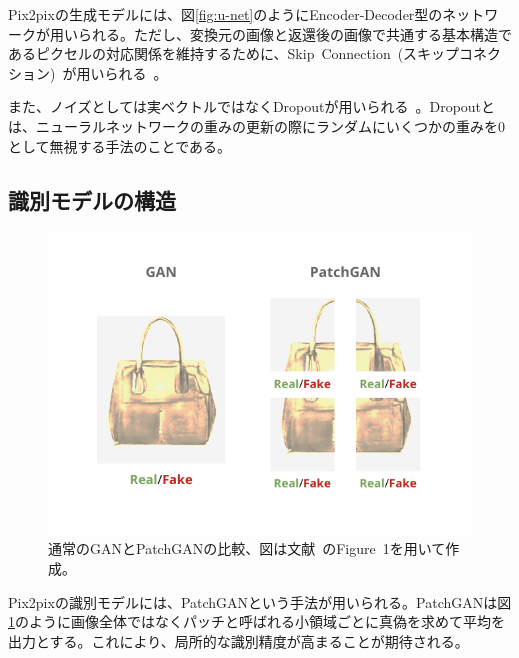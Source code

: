 Pix2pixの生成モデルには、図\ref{fig:u-net}のようにEncoder-Decoder型のネットワークが用いられる。ただし、変換元の画像と返還後の画像で共通する基本構造であるピクセルの対応関係を維持するために、Skip~Connection~(スキップコネクション)~が用いられる~\cite{u-net}。

また、ノイズとしては実ベクトルではなくDropoutが用いられる~\cite{Dropout}。Dropoutとは、ニューラルネットワークの重みの更新の際にランダムにいくつかの重みを0として無視する手法のことである。

\subsection{識別モデルの構造}

\begin{figure}[t]
\begin{center}
\includegraphics[width=0.95\hsize]{figure/patchgan.png}
\caption{通常のGANとPatchGANの比較、図は文献~\cite{pix2pix}のFigure~1を用いて作成。}
\label{fig:patchgan}
\end{center}
\end{figure}

Pix2pixの識別モデルには、PatchGANという手法が用いられる。PatchGANは図\ref{fig:patchgan}のように画像全体ではなくパッチと呼ばれる小領域ごとに真偽を求めて平均を出力とする。これにより、局所的な識別精度が高まることが期待される。